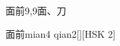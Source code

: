 \begin{entry}{面前}{9,9}{⾯、⼑}
  \begin{phonetics}{面前}{mian4 qian2}[][HSK 2]
  \end{phonetics}
\end{entry}
